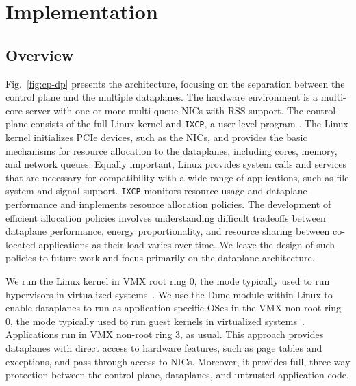  
\section{\ix Implementation}
\label{sec:impl}





\subsection{Overview}
\label{sec:impl:overview}

Fig.~\ref{fig:cp-dp} presents the \ix architecture, focusing on the
separation between the control plane and the multiple dataplanes.  The
hardware environment is a multi-core server with one or more
multi-queue NICs with RSS support. The \ix control plane consists of the full Linux kernel and
\texttt{IXCP}, a user-level program . The Linux kernel
initializes PCIe devices, such as the NICs, and provides the basic
mechanisms for resource allocation to the dataplanes, including cores,
memory, and network queues. Equally important, Linux provides system
calls and services that are necessary for compatibility with a wide
range of applications, such as file system and signal
support. \texttt{IXCP} monitors resource usage and dataplane
performance and implements resource allocation policies. The
development of efficient allocation policies involves understanding
difficult tradeoffs between dataplane performance, energy
proportionality, and resource sharing between co-located applications
as their load varies over time. We leave the design of such policies
to future work and focus primarily on the \ix dataplane architecture.

We run the Linux kernel in VMX root ring 0, the mode typically used to
run hypervisors in virtualized
systems~\cite{DBLP:journals/computer/UhligNRSMABKLS05}. We use the
Dune module within Linux to enable dataplanes to run as
application-specific OSes in the VMX non-root ring 0, the mode
typically used to run guest kernels in virtualized
systems~\cite{dune}.  Applications run in VMX non-root ring 3, as
usual.  This approach provides dataplanes with direct access to
hardware features, such as page tables and exceptions, and pass-through
access to NICs. Moreover, it provides full, three-way protection
between the control plane, dataplanes, and untrusted application code.

